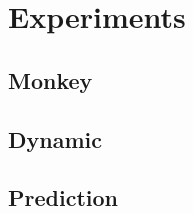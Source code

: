
\chapter{Experiments}\label{ch:experiments}

\section{Monkey}


\section{Dynamic}


\section{Prediction}


